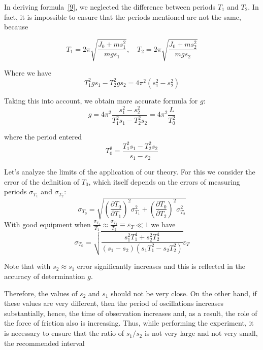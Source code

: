 \documentclass{LabWorkEng}
\begin{document}
In deriving formula~\eqref{9}, we neglected the difference between periods $T_1$ and $T_2$. In fact, it is impossible to ensure that the periods mentioned are not the same, because

\begin{equation}\label{10}
	{T_1} = 2\pi \sqrt {\frac{{{J_0} + ms_1^2}}{{mg{s_1}}}}, \quad{T_2} = 2\pi \sqrt {\frac{{{J_0} + ms_2^2}}{{mg{s_2}}}}
\end{equation}

Where we have
\begin{equation*}
	T_1^2g{s_1} - T_2^2g{s_2} = 4{\pi ^2}\left( {s_1^2 - s_2^2} \right)
\end{equation*}

Taking this into account, we obtain more accurate formula for $g$:
\begin{equation}\label{11}
	g = 4{\pi ^2}\frac{{s_1^2 - s_2^2}}{{T_1^2{s_1} - T_2^2{s_2}}} = 4{\pi ^2}\frac{L}{{T_0^2}}
\end{equation}

where the period entered
\begin{equation}\label{12}
	T_0^2 = \frac{{T_1^2{s_1} - T_2^2{s_2}}}{{{s_1} - {s_2}}}
\end{equation}

Let's analyze the limits of the application of our theory. For this we consider the error of the definition of $T_0$, which itself depends on the errors of measuring periods $\sigma_{T_1}$   and $\sigma_{T_2}$:
\begin{equation}\label{13}
	{\sigma _{{T_0}}} = \sqrt {{{\left( {\frac{{\partial {T_0}}}{{\partial {T_1}}}} \right)}^2}\sigma _{{T_1}}^2 + {{\left( {\frac{{\partial {T_0}}}{{\partial {T_2}}}} \right)}^2}\sigma _{{T_2}}^2}
\end{equation}
With good equipment when \(\frac{{{\sigma _{{T_1}}}}}{{{T_1}}} \approx \frac{{{\sigma _{{T_2}}}}}{{{T_2}}} \equiv {\varepsilon _T} \ll 1\) we have
\begin{equation}\label{14}
	{\sigma _{{T_0}}} = \sqrt {\frac{{s_1^2T_1^4 + s_2^2T_2^4}}{{\left( {{s_1} - {s_2}} \right)\left( {{s_1}T_1^2 - {s_2}T_2^2} \right)}}} {\varepsilon _T}
\end{equation}


Note that with $s_2 \approx s_1$ error significantly increases and this is reflected in the accuracy of determination $g$.

Therefore, the values of $s_2$ and $s_1$ should not be very close. On the other hand, if these values are very different, then the period of oscillations increases substantially, hence, the time of observation increases  and, as a result, the role of the force of friction also is increasing. Thus, while performing the experiment, it is necessary to ensure that the ratio of $s_1/s_2$ is not very large and not very small, the recommended interval
\end{document}

